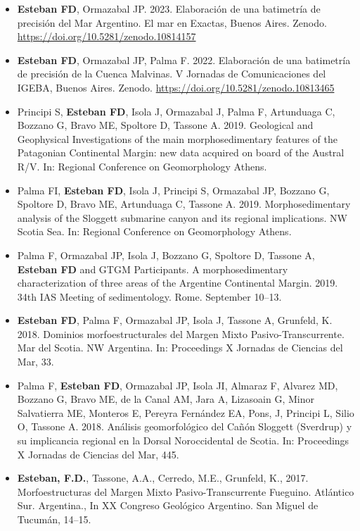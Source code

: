 \documentclass[11pt, a4paper]{article}
\begin{document}
\begin{itemize}
  \item \textbf{Esteban FD}, Ormazabal JP. 2023. Elaboración de una batimetría de precisión del Mar Argentino. El mar en Exactas, Buenos Aires. Zenodo. \url{https://doi.org/10.5281/zenodo.10814157}

  \item \textbf{Esteban FD}, Ormazabal JP, Palma F. 2022. Elaboración de una batimetría de precisión de la Cuenca Malvinas. V Jornadas de Comunicaciones del IGEBA, Buenos Aires. Zenodo. \url{https://doi.org/10.5281/zenodo.10813465}

  \item Principi S, \textbf{Esteban FD}, Isola J, Ormazabal J, Palma F, Artunduaga C, Bozzano G, Bravo ME, Spoltore D, Tassone A. 2019. Geological and Geophysical Investigations of the main morphosedimentary features of the Patagonian Continental Margin: new data acquired on board of the Austral R/V. In: Regional Conference on Geomorphology Athens.

  \item Palma FI, \textbf{Esteban FD}, Isola J, Principi S, Ormazabal JP, Bozzano G, Spoltore D, Bravo ME, Artunduaga C, Tassone A. 2019. Morphosedimentary analysis of the Sloggett submarine canyon and its regional implications. NW Scotia Sea. In: Regional Conference on Geomorphology Athens.

  \item Palma F, Ormazabal JP, Isola J, Bozzano G, Spoltore D, Tassone A, \textbf{Esteban FD} and GTGM Participants. A morphosedimentary characterization of three areas of the Argentine Continental Margin. 2019. 34th IAS Meeting of sedimentology. Rome. September 10--13.

  \item \textbf{Esteban FD}, Palma F, Ormazabal JP, Isola J, Tassone A, Grunfeld, K. 2018. Dominios morfoestructurales del Margen Mixto Pasivo-Transcurrente. Mar del Scotia. NW Argentina. In: Proceedings X Jornadas de Ciencias del Mar, 33.

  \item Palma F, \textbf{Esteban FD}, Ormazabal JP, Isola JI, Almaraz F, Alvarez MD, Bozzano G, Bravo ME, de la Canal AM, Jara A, Lizasoain G, Minor Salvatierra ME, Monteros E, Pereyra Fernández EA, Pons, J, Principi L, Silio O, Tassone A. 2018. Análisis geomorfológico del Cañón Sloggett (Sverdrup) y su implicancia regional en la Dorsal Noroccidental de Scotia. In: Proceedings X Jornadas de Ciencias del Mar, 445.

  \item \textbf{Esteban, F.D.}, Tassone, A.A., Cerredo, M.E., Grunfeld, K., 2017. Morfoestructuras del Margen Mixto Pasivo-Transcurrente Fueguino. Atlántico Sur. Argentina., In XX Congreso Geológico Argentino. San Miguel de Tucumán, 14–15.


\end{itemize}
\end{document}
